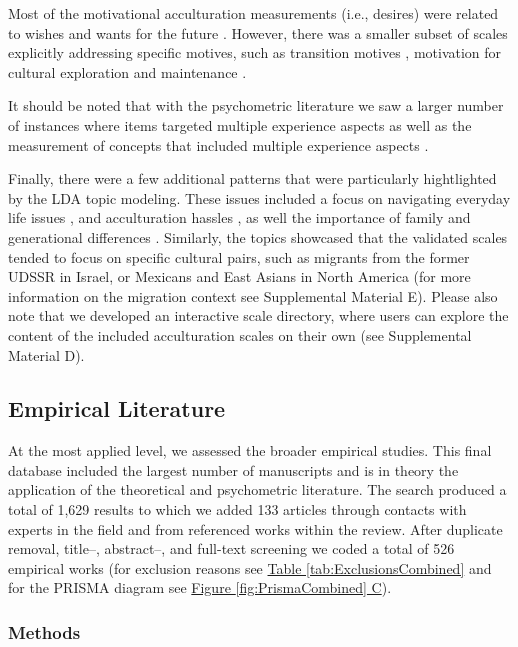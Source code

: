 \documentclass[man, 12pt, a4paper, mask]{apa7}
\newcommand{\fgrref}[2][]{\hyperref[#2]{Figure \ref*{#2}#1}}
\newcommand{\tblref}[2][]{\hyperref[#2]{Table \ref*{#2}#1}}
\begin{document}
Most of the motivational acculturation measurements (i.e., desires) were
related to wishes and wants for the future
\citep[e.g.,][]{Mancini2014, Ben-Shalom2003}. However, there was a
smaller subset of scales explicitly addressing specific motives, such as
transition motives \citep[][]{Mchitarjan2015}, motivation for cultural
exploration and maintenance \citep[][]{Recker2017}.

It should be noted that with the psychometric literature we saw a larger
number of instances where items targeted multiple experience aspects
\citep[e.g., enjoyment of wearing traditional clothing,][]{Ozer2016} as
well as the measurement of concepts that included multiple experience
aspects \citep[e.g., satisfaction,][]{Cuellar1995a}.

Finally, there were a few additional patterns that were particularly
hightlighted by the LDA topic modeling. These issues included a focus on
navigating everyday life issues \citep[e.g.,][]{Harder2018}, and
acculturation hassles \citep[e.g.,][]{Vinokurov2002}, as well the
importance of family and generational differences
\citep[e.g.,][]{ICSEYteam2006, Lee2004b}. Similarly, the topics
showcased that the validated scales tended to focus on specific cultural
pairs, such as migrants from the former UDSSR in Israel, or Mexicans and
East Asians in North America (for more information on the migration
context see Supplemental Material E). Please also note that we developed
an interactive scale directory, where users can explore the content of
the included acculturation scales on their own (see Supplemental
Material D).

\subsection{Empirical Literature}

At the most applied level, we assessed the broader empirical studies.
This final database included the largest number of manuscripts and is in
theory the application of the theoretical and psychometric literature.
The search produced a total of 1,629 results to which we added 133
articles through contacts with experts in the field and from referenced
works within the review. After duplicate removal, title--, abstract--,
and full-text screening we coded a total of 526 empirical works (for
exclusion reasons see \tblref{tab:ExclusionsCombined} and for the PRISMA
diagram see \fgrref[ C]{fig:PrismaCombined}).

\subsubsection{Methods}
\end{document}
